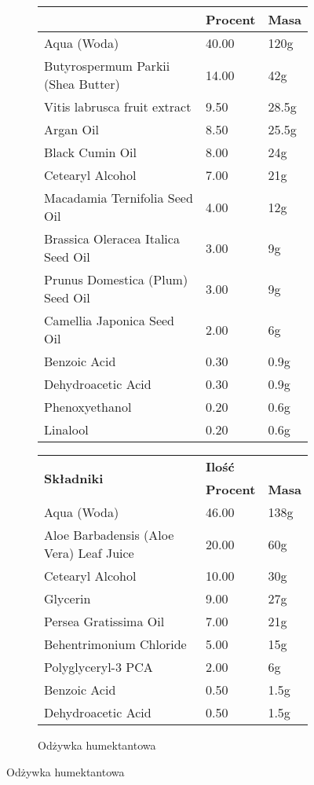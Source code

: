 {\begin{figure}[H]
\begin{footnotesize}
\begin{subfigure}[t]{0.5\textwidth}
\begin{tabular}{p{}ll}
			\cline{2-3}
			& \textbf{Procent} & \textbf{Masa} \\
				\hline\hline
				Aqua (Woda) & 40.00 & 120g \\
				Butyrospermum Parkii (Shea Butter) & 14.00 & 42g \\
				Vitis labrusca fruit extract & 9.50 & 28.5g \\
				Argan Oil & 8.50 & 25.5g \\
				Black Cumin Oil & 8.00 & 24g \\
				Cetearyl Alcohol & 7.00 & 21g \\
				Macadamia Ternifolia Seed Oil & 4.00 & 12g \\
				Brassica Oleracea Italica Seed Oil & 3.00 & 9g \\
				Prunus Domestica (Plum) Seed Oil & 3.00 & 9g \\
				Camellia Japonica Seed Oil & 2.00 & 6g \\
				Benzoic Acid & 0.30 & 0.9g \\
				Dehydroacetic Acid & 0.30 & 0.9g \\
				Phenoxyethanol & 0.20 & 0.6g \\
				Linalool & 0.20 & 0.6g \\
			\hline
		\end{tabular}
	\end{subfigure}

	\begin{subfigure}{0.5\textwidth}
		\centering
		\caption{Odżywka humektantowa}
		\begin{tabular}{p{}ll}
			\hline
			\multirow{2}{*}{\textbf{Składniki}} & \multicolumn{2}{l}{\textbf{Ilość}} \\
			\cline{2-3}
			& \textbf{Procent} & \textbf{Masa} \\
				\hline\hline
				Aqua (Woda) & 46.00 & 138g \\
				Aloe Barbadensis (Aloe Vera) Leaf Juice & 20.00 & 60g \\
				Cetearyl Alcohol & 10.00 & 30g \\
				Glycerin  & 9.00 & 27g \\
				Persea Gratissima Oil & 7.00 & 21g \\
				Behentrimonium Chloride & 5.00 & 15g \\
				Polyglyceryl-3 PCA & 2.00 & 6g \\
				Benzoic Acid & 0.50 & 1.5g \\
				Dehydroacetic Acid & 0.50 & 1.5g \\
				\hline
			\end{tabular}
	\end{subfigure}
\end{footnotesize}
\end{figure}
}

